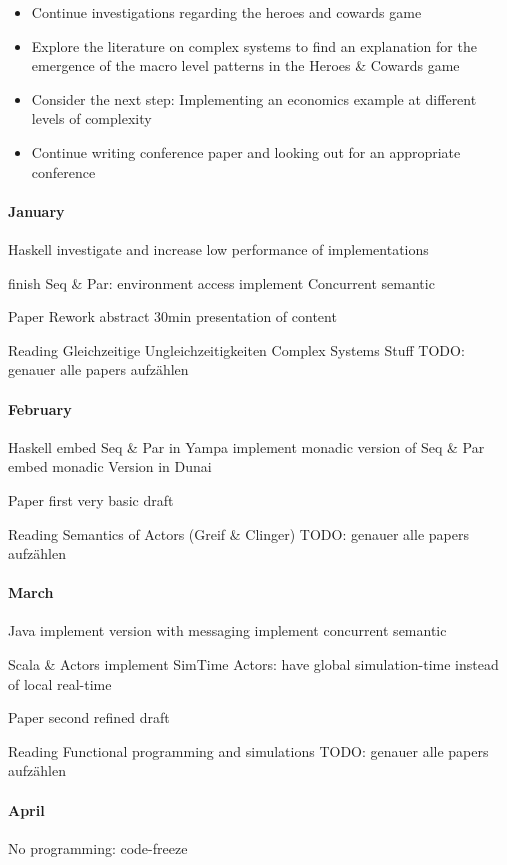 \begin{itemize}
\item Continue investigations regarding the heroes and cowards game
\item Explore the literature on complex systems to find an explanation for the emergence of the macro level patterns in the Heroes \& Cowards game
\item Consider the next step: Implementing an economics example at different levels of complexity 
\item Continue writing conference paper and looking out for an appropriate conference
\end{itemize}

\paragraph{January}
Haskell
	investigate and increase low performance of implementations
	
	finish Seq & Par: environment access
	implement Concurrent semantic
	
Paper
	Rework abstract
	30min presentation of content
	
Reading
	Gleichzeitige Ungleichzeitigkeiten
	Complex Systems Stuff
	TODO: genauer alle papers aufzählen
	
\paragraph{February}
Haskell
	embed Seq & Par in Yampa
	implement monadic version of Seq & Par
	embed monadic Version in Dunai

Paper
	first very basic draft
	
Reading
	Semantics of Actors (Greif & Clinger)
	TODO: genauer alle papers aufzählen
	
\paragraph{March}
Java
	implement version with messaging
	implement concurrent semantic
	
Scala \& Actors
	implement SimTime Actors: have global simulation-time instead of local real-time

Paper
	second refined draft
	
Reading
	Functional programming and simulations
	TODO: genauer alle papers aufzählen
	
\paragraph{April}
No programming: code-freeze

